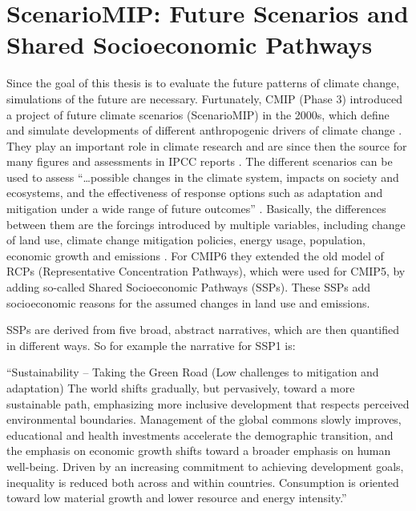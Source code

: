 \section{ScenarioMIP: Future Scenarios and Shared Socioeconomic Pathways}

\label{sec:scenariomip}

Since the goal of this thesis is to evaluate the future patterns of climate change, simulations of the future are necessary. 
Furtunately, CMIP (Phase 3) introduced a project of future climate scenarios (ScenarioMIP) in the 2000s, which define and simulate developments of different anthropogenic drivers of climate change \cite{oneill_scenario_2016}. 
They play an important role in climate research and are since then the source for many figures and assessments in IPCC reports \cite{touzepeiffer_coupled_2020}. 
The different scenarios can be used to assess \enquote{\dots possible changes in the climate system, impacts on society and ecosystems, and the effectiveness of response options such as adaptation and mitigation under a wide range of future outcomes} \cite{oneill_scenario_2016}.
Basically, the differences between them are the forcings introduced by multiple variables, including change of land use, climate change mitigation policies, energy usage, population, economic growth and emissions \cite{riahi_shared_2017}.   
For CMIP6 they extended the old model of RCPs (Representative Concentration Pathways), which were used for CMIP5, by adding so-called Shared Socioeconomic Pathways (SSPs). 
These SSPs add socioeconomic reasons for the assumed changes in land use and emissions. 


SSPs are derived from five broad, abstract narratives, which are then quantified in different ways. 
So for example the narrative for SSP1 is: 

\begin{center}
  \enquote{Sustainability – Taking the Green Road (Low challenges to mitigation and adaptation) The world shifts gradually, but pervasively, toward a more sustainable path, emphasizing more inclusive development that respects perceived environmental boundaries. Management of the global commons slowly improves, educational and health investments accelerate the demographic transition, and the emphasis on economic growth shifts toward a broader emphasis on human well-being. Driven by an increasing commitment to achieving development goals, inequality is reduced both across and within countries. Consumption is oriented toward low material growth and lower resource and energy intensity.} \cite{riahi_shared_2017}
\end{center}

